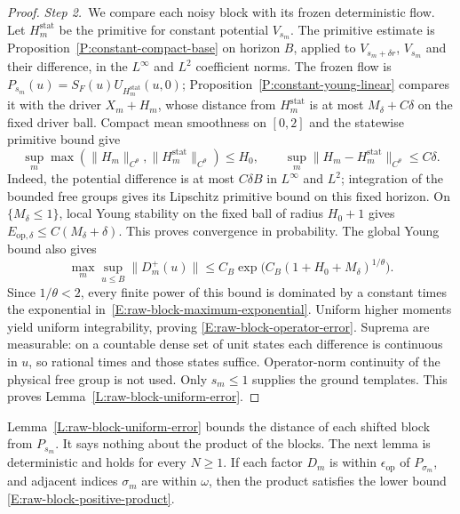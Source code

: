 \begin{proof}
  \medskip
  \noindent\textit{Step 2.~}We compare each noisy block with its frozen
  deterministic flow.
  Let $H_m^{\mathrm{stat}}$ be the primitive for constant potential $V_{s_m}$.
  The primitive estimate is Proposition~\ref{P:constant-compact-base} on
  horizon $B$, applied to $V_{s_m+\delta r}$, $V_{s_m}$ and their difference,
  in the $L^\infty$ and $L^2$ coefficient norms.
  The frozen flow is $P_{s_m}(u)=S_F(u)U_{H_m^{\mathrm{stat}}}(u,0)$;
  Proposition~\ref{P:constant-young-linear} compares it with the driver
  $X_m+H_m$, whose distance from $H_m^{\mathrm{stat}}$ is at most
  $M_\delta+C\delta$ on the fixed driver ball.
  Compact mean smoothness on $[0,2]$ and the statewise primitive bound give
  \[
    \sup_m\max(\|H_m\|_{C^\theta},
    \|H_m^{\mathrm{stat}}\|_{C^\theta})\le H_0,\qquad
    \sup_m\|H_m-H_m^{\mathrm{stat}}\|_{C^\theta}\le C\delta.
  \]
  Indeed, the potential difference is at most $C\delta B$ in $L^\infty$ and
  $L^2$; integration of the bounded free groups gives its Lipschitz primitive
  bound on this fixed horizon. On $\{M_\delta\le1\}$, local Young stability on
  the fixed ball of radius $H_0+1$ gives $E_{\mathrm{op},\delta} \le
  C(M_\delta+\delta)$. This proves convergence in probability. The global Young
  bound also gives
  \[
    \max_m\sup_{u\le B}\|D_m^+(u)\|
    \le C_B\exp\big(C_B(1+H_0+M_\delta)^{1/\theta}\big).
  \]
  Since $1/\theta < 2$, every finite power of this bound is dominated by a
  constant times the exponential in~\eqref{E:raw-block-maximum-exponential}.
  Uniform higher moments yield uniform integrability, proving
  \eqref{E:raw-block-operator-error}. Suprema are measurable: on a countable
  dense set of unit states each difference is continuous in $u$, so rational
  times and those states suffice. Operator-norm continuity of the physical free
  group is not used. Only $s_m \le 1$ supplies the ground templates. This proves
  Lemma~\ref{L:raw-block-uniform-error}.
\end{proof}

Lemma~\ref{L:raw-block-uniform-error} bounds the distance of each shifted block
from $P_{s_m}$. It says nothing about the product of the blocks. The next lemma
is deterministic and holds for every $N \ge 1$. If each factor $D_m$ is within
$\epsilon_{\mathrm{op}}$ of $P_{\sigma_m}$, and adjacent indices $\sigma_m$ are
within $\omega$, then the product satisfies the lower bound
\eqref{E:raw-block-positive-product}.

